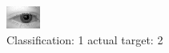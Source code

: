 \begin{figure}[h!]
\begin{center}
\includegraphics[width=0.60\columnwidth]{figures/ID501_class_1_target_2.png}
\end{center}
\caption{ Classification: 1 actual target: 2}
\label{fig:ID501_class_1_target_2}
\end{figure}
